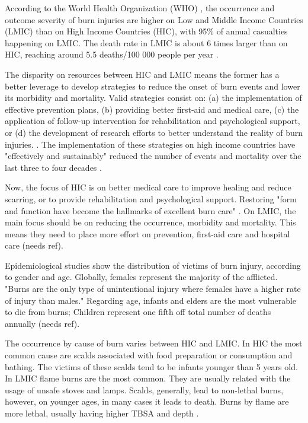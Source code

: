 \bigskip
According to the World Health Organization (WHO) \cite{who2011_sucess_stories}, the occurrence and outcome severity of burn injuries are higher on Low and Middle Income Countries (LMIC) than on High Income Countries (HIC), with 95\% of annual casualties happening on LMIC. The death rate in LMIC is about 6 times larger than on HIC, reaching around 5.5 deaths/100 000 people per year \cite{who2011_sucess_stories}. 

The disparity on resources between HIC and LMIC means the former has a better leverage to develop strategies to reduce the onset of burn events and lower its morbidity and mortality. Valid strategies consist on: (a) the implementation of effective prevention plans, (b) providing better first-aid and medical care, (c) the application of follow-up intervention for rehabilitation and psychological support, or (d) the development of research efforts to better understand the reality of burn injuries. \cite{who2008_plan_burn_prevention_care, who2011_sucess_stories}. The implementation of these strategies on high income countries have "effectively and sustainably" reduced the number of events and mortality over the last three to four decades \cite{who2011_sucess_stories}. 

Now, the focus of HIC is on better medical care to improve healing and reduce scarring, or to provide rehabilitation and psychological support. Restoring "form and function have become the hallmarks of excellent burn care" \cite{isbi_guidelines_burn_care}. On LMIC, the main focus should be on reducing the occurrence, morbidity and mortality. This means they need to place more effort on prevention, first-aid care and hospital care {\color{red}(needs ref)}.

Epidemiological studies show the distribution of victims of burn injury, according to gender and age. Globally, females represent the majority of the afflicted. "Burns are the only type of unintentional injury where females have a higher rate of injury than males." \cite{who_unicef2008_burns_chapter} Regarding age, infants and elders are the most vulnerable to die from burns; Children represent one fifth off total number of deaths annually {\color{red}(needs ref)}. 

The occurrence by cause of burn varies between HIC and LMIC. In HIC the most common cause are scalds associated with food preparation or consumption and bathing. The victims of these scalds tend to be infants younger than 5 years old. In LMIC flame burns are the most common. They are usually related with the usage of unsafe stoves and lamps. Scalds, generally, lead to non-lethal burns, however, on younger ages, in many cases it leads to death. Burns by flame are more lethal, usually having higher TBSA and depth \cite{who2011_sucess_stories, who_unicef2008_burns_chapter}.

